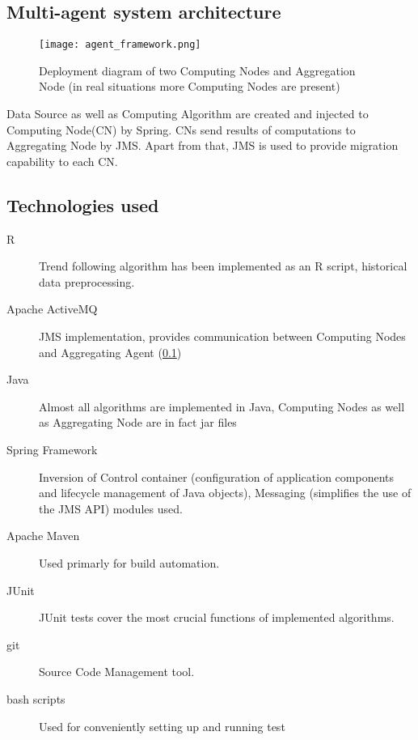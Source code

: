 \subsection{Multi-agent system architecture}
\label{multi-agent}

\begin{figure}[H]
  \begin{center}
    \texttt{[image: agent\_framework.png]}
  \end{center}
  \caption{Deployment diagram of two Computing Nodes and Aggregation Node (in real situations more Computing Nodes are present)}
\end{figure}

Data Source as well as Computing Algorithm are created and injected to Computing Node(CN) by Spring. 
CNs send results of computations to Aggregating Node by JMS. 
Apart from that, JMS is used to provide migration capability to each CN.

\subsection{Technologies used}

\begin{description}
  \item [R]
      Trend following algorithm has been implemented as an R script, historical data preprocessing.
  \item [Apache ActiveMQ]
      JMS implementation, provides communication between Computing Nodes and Aggregating Agent (\ref{multi-agent})
  \item [Java]
      Almost all algorithms are implemented in Java, Computing Nodes as well as Aggregating Node are in fact jar files 
  \item [Spring Framework]
      Inversion of Control container (configuration of application components and lifecycle management of Java objects), Messaging (simplifies the use of the JMS API) modules used.
  \item [Apache Maven]
      Used primarly for build automation.
  \item [JUnit]
      JUnit tests cover the most crucial functions of implemented algorithms.
  \item [git]
      Source Code Management tool.
  \item [bash scripts]
      Used for conveniently setting up and running test 
\end{description}

 